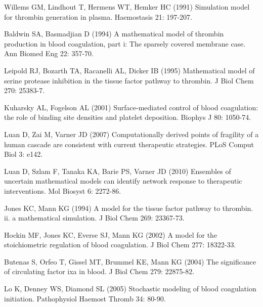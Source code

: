 \documentclass[processes,article,received,moreauthors,pdftex,12pt,a4paper]{mdpi}
\begin{document}
\begin{thebibliography}{9999}
Willems GM, Lindhout T, Hermens WT, Hemker HC (1991) Simulation model for
  thrombin generation in plasma.
\newblock Haemostasis 21: 197-207.

Baldwin SA, Basmadjian D (1994) A mathematical model of thrombin production in
  blood coagulation, part i: The sparsely covered membrane case.
\newblock Ann Biomed Eng 22: 357-70.

Leipold RJ, Bozarth TA, Racanelli AL, Dicker IB (1995) Mathematical model of
  serine protease inhibition in the tissue factor pathway to thrombin.
\newblock J Biol Chem 270: 25383-7.

Kuharsky AL, Fogelson AL (2001) Surface-mediated control of blood coagulation:
  the role of binding site densities and platelet deposition.
\newblock Biophys J 80: 1050-74.

Luan D, Zai M, Varner JD (2007) Computationally derived points of fragility of
  a human cascade are consistent with current therapeutic strategies.
\newblock PLoS Comput Biol 3: e142.

Luan D, Szlam F, Tanaka KA, Barie PS, Varner JD (2010) Ensembles of uncertain
  mathematical models can identify network response to therapeutic
  interventions.
\newblock Mol Biosyst 6: 2272-86.

Jones KC, Mann KG (1994) A model for the tissue factor pathway to thrombin. ii.
  a mathematical simulation.
\newblock J Biol Chem 269: 23367-73.

Hockin MF, Jones KC, Everse SJ, Mann KG (2002) A model for the stoichiometric
  regulation of blood coagulation.
\newblock J Biol Chem 277: 18322-33.

Butenas S, Orfeo T, Gissel MT, Brummel KE, Mann KG (2004) The significance of
  circulating factor ixa in blood.
\newblock J Biol Chem 279: 22875-82.

Lo K, Denney WS, Diamond SL (2005) Stochastic modeling of blood coagulation
  initiation.
\newblock Pathophysiol Haemost Thromb 34: 80-90.


\end{thebibliography}
\end{document}
